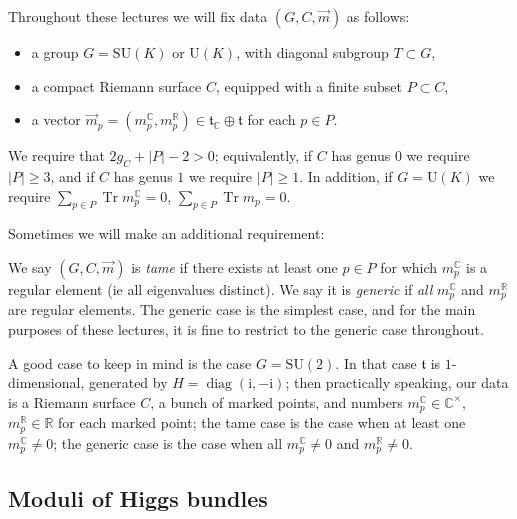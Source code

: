 \documentclass[12pt,letterpaper,reqno]{article}
\numberwithin{equation}{section}
\newcommand{\ft}{{\mathfrak t}}
\newcommand{\R}{\ensuremath{\mathbb R}}
\newcommand{\C}{\ensuremath{\mathbb C}}
\newcommand{\I}{{\mathrm i}}
\newcommand{\abs}[1]{\lvert#1\rvert}
\newcommand{\ti}[1]{\textit{#1}}
\DeclareMathOperator{\Tr}{Tr}
\DeclareMathOperator{\diag}{diag}
\newcommand{\SU}{\mathrm{SU}}
\newcommand{\U}{\mathrm{U}}
\newcommand{\insfig}[2]{

\medskip
\noindent
\begin{minipage}{\linewidth}

\makebox[\linewidth]{\texttt{[image: figures/\#1-crop.pdf]}}

\end{minipage}
\medskip

}
\newcommand{\fixme}[1]{{\color{orange}{[#1]}}}
\begin{document}
Throughout these lectures we will fix data $(G,C,\vec m)$ as follows:
\begin{itemize}
  \item a group $G = \SU(K)$ or $\U(K)$, with diagonal subgroup $T \subset G$,
  \item a compact Riemann surface $C$, equipped with a finite subset $P \subset C$,
  \item a vector $\vec{m}_p = (m^\C_p, m^\R_p) \in \ft_\C \oplus \ft$ for each $p \in P$.
\end{itemize}
We require that $2g_C + \abs{P} - 2 > 0$; equivalently, 
if $C$ has genus $0$ we require $\abs{P} \ge 3$, 
and if $C$ has genus $1$ we require $\abs{P} \ge 1$.
In addition, if 
$G = \U(K)$ we require $\sum_{p \in P} \Tr m_p^\C = 0$, $\sum_{p \in P} \Tr m_p = 0$.
\insfig{higgs-metric-1}{0.8}
Sometimes we will make an additional requirement:
\begin{defn}
We say $(G,C,\vec{m})$ is \ti{tame} if there exists at least one $p \in P$
for which $m^\C_p$ is a regular element (ie all eigenvalues distinct). We say it is \ti{generic} if \ti{all} $m^\C_p$
and $m^\R_p$ are regular elements. The generic case is the simplest
case, and for the main purposes of these lectures,
it is fine to restrict to the generic case throughout.
\end{defn}

\begin{example}[The case of $G = \SU(2)$]
A good case to keep in mind is the case $G = \SU(2)$. In that case $\ft$ is $1$-dimensional,
generated by $H = \diag(\I,-\I)$; then 
practically speaking, our data is a Riemann surface $C$, a bunch of marked points,
and numbers $m^\C_p \in \C^\times$, $m^\R_p \in \R$ for each marked point; the tame case
is the case when at least one $m^\C_p \neq 0$;
the generic case is the case when all $m^\C_p \neq 0$
and $m^\R_p \neq 0$.
\end{example}

\fixme{remark on irregular singularities?}

\subsection{Moduli of Higgs bundles}
\end{document}
